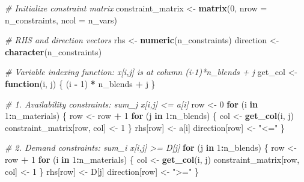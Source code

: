 \documentclass[
]{article}
\newenvironment{Shaded}{\begin{snugshade}}{\end{snugshade}}
\newcommand{\AttributeTok}[1]{\textcolor[rgb]{0.13,0.29,0.53}{#1}}
\newcommand{\CommentTok}[1]{\textcolor[rgb]{0.56,0.35,0.01}{\textit{#1}}}
\newcommand{\ControlFlowTok}[1]{\textcolor[rgb]{0.13,0.29,0.53}{\textbf{#1}}}
\newcommand{\DecValTok}[1]{\textcolor[rgb]{0.00,0.00,0.81}{#1}}
\newcommand{\FunctionTok}[1]{\textcolor[rgb]{0.13,0.29,0.53}{\textbf{#1}}}
\newcommand{\NormalTok}[1]{#1}
\newcommand{\OtherTok}[1]{\textcolor[rgb]{0.56,0.35,0.01}{#1}}
\newcommand{\SpecialCharTok}[1]{\textcolor[rgb]{0.81,0.36,0.00}{\textbf{#1}}}
\newcommand{\StringTok}[1]{\textcolor[rgb]{0.31,0.60,0.02}{#1}}
\begin{document}
\begin{Shaded}
\begin{Highlighting}[]
\CommentTok{\# Initialize constraint matrix}
\NormalTok{constraint\_matrix }\OtherTok{\textless{}{-}} \FunctionTok{matrix}\NormalTok{(}\DecValTok{0}\NormalTok{, }\AttributeTok{nrow =}\NormalTok{ n\_constraints, }\AttributeTok{ncol =}\NormalTok{ n\_vars)}

\CommentTok{\# RHS and direction vectors}
\NormalTok{rhs }\OtherTok{\textless{}{-}} \FunctionTok{numeric}\NormalTok{(n\_constraints)}
\NormalTok{direction }\OtherTok{\textless{}{-}} \FunctionTok{character}\NormalTok{(n\_constraints)}

\CommentTok{\# Variable indexing function: x[i,j] is at column (i{-}1)*n\_blends + j}
\NormalTok{get\_col }\OtherTok{\textless{}{-}} \ControlFlowTok{function}\NormalTok{(i, j) \{}
\NormalTok{  (i }\SpecialCharTok{{-}} \DecValTok{1}\NormalTok{) }\SpecialCharTok{*}\NormalTok{ n\_blends }\SpecialCharTok{+}\NormalTok{ j}
\NormalTok{\}}

\CommentTok{\# 1. Availability constraints: sum\_j x[i,j] \textless{}= a[i]}
\NormalTok{row }\OtherTok{\textless{}{-}} \DecValTok{0}
\ControlFlowTok{for}\NormalTok{ (i }\ControlFlowTok{in} \DecValTok{1}\SpecialCharTok{:}\NormalTok{n\_materials) \{}
\NormalTok{  row }\OtherTok{\textless{}{-}}\NormalTok{ row }\SpecialCharTok{+} \DecValTok{1}
  \ControlFlowTok{for}\NormalTok{ (j }\ControlFlowTok{in} \DecValTok{1}\SpecialCharTok{:}\NormalTok{n\_blends) \{}
\NormalTok{    col }\OtherTok{\textless{}{-}} \FunctionTok{get\_col}\NormalTok{(i, j)}
\NormalTok{    constraint\_matrix[row, col] }\OtherTok{\textless{}{-}} \DecValTok{1}
\NormalTok{  \}}
\NormalTok{  rhs[row] }\OtherTok{\textless{}{-}}\NormalTok{ a[i]}
\NormalTok{  direction[row] }\OtherTok{\textless{}{-}} \StringTok{"\textless{}="}
\NormalTok{\}}

\CommentTok{\# 2. Demand constraints: sum\_i x[i,j] \textgreater{}= D[j]}
\ControlFlowTok{for}\NormalTok{ (j }\ControlFlowTok{in} \DecValTok{1}\SpecialCharTok{:}\NormalTok{n\_blends) \{}
\NormalTok{  row }\OtherTok{\textless{}{-}}\NormalTok{ row }\SpecialCharTok{+} \DecValTok{1}
  \ControlFlowTok{for}\NormalTok{ (i }\ControlFlowTok{in} \DecValTok{1}\SpecialCharTok{:}\NormalTok{n\_materials) \{}
\NormalTok{    col }\OtherTok{\textless{}{-}} \FunctionTok{get\_col}\NormalTok{(i, j)}
\NormalTok{    constraint\_matrix[row, col] }\OtherTok{\textless{}{-}} \DecValTok{1}
\NormalTok{  \}}
\NormalTok{  rhs[row] }\OtherTok{\textless{}{-}}\NormalTok{ D[j]}
\NormalTok{  direction[row] }\OtherTok{\textless{}{-}} \StringTok{"\textgreater{}="}
\NormalTok{\}}


\end{Highlighting}
\end{Shaded}
\end{document}

